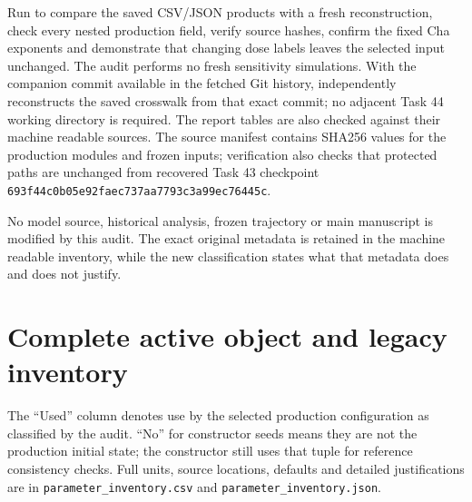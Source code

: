 Run  to compare the saved CSV/JSON products with a fresh reconstruction, check every nested production field, verify source hashes, confirm the fixed Cha exponents and demonstrate that changing dose labels leaves the selected input unchanged. The audit performs no fresh sensitivity simulations. With the companion commit available in the fetched Git history,  independently reconstructs the saved crosswalk from that exact commit; no adjacent Task 44 working directory is required. The report tables are also checked against their machine readable sources. The source manifest contains SHA256 values for the production modules and frozen inputs; verification also checks that protected paths are unchanged from recovered Task 43 checkpoint \texttt{693f44c0b05e92faec737aa7793c3a99ec76445c}.

No model source, historical analysis, frozen trajectory or main manuscript is modified by this audit. The exact original metadata is retained in the machine readable inventory, while the new classification states what that metadata does and does not justify.

\section{Complete active object and legacy inventory}
The ``Used'' column denotes use by the selected production configuration as classified by the audit. ``No'' for constructor seeds means they are not the production initial state; the constructor still uses that tuple for reference consistency checks. Full units, source locations, defaults and detailed justifications are in \texttt{parameter\_inventory.csv} and \texttt{parameter\_inventory.json}.

